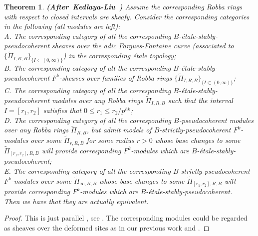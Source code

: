 \documentclass[12pt]{amsart}
\newtheorem{theorem}{Theorem}[section]
\theoremstyle{definition}
\numberwithin{equation}{section}
\begin{document}
\begin{theorem}\mbox{\bf{(After Kedlaya-Liu \cite[Theorem 4.6.1]{KL2})}}
Assume the corresponding Robba rings with respect to closed intervals are sheafy. Consider the corresponding categories in the following (all modules are left):\\
A. The corresponding category of all the corresponding $B$-\'etale-stably-pseudocoherent sheaves over the adic Fargues-Fontaine curve (associated to $\{\widetilde{\Pi}_{I,R,B}\}_{\{I\subset (0,\infty)\}}$) in the corresponding \'etale topology;\\
B. The corresponding category of all the corresponding $B$-\'etale-stably-pseudocoherent $F^k$-sheaves over families of Robba rings $\{\widetilde{\Pi}_{I,R,B}\}_{\{I\subset (0,\infty)\}}$;\\
C. The corresponding category of all the corresponding $B$-\'etale-stably-pseudocoherent modules over any Robba rings $\widetilde{\Pi}_{I,R,B}$ such that the interval $I=[r_1,r_2]$ satisfies that $0\leq r_1 \leq r_2/p^{hk}$;\\
D. The corresponding category of all the corresponding $B$-pseudocoherent modules over any Robba rings $\widetilde{\Pi}_{R,B}$, but admit models of $B$-strictly-pseudocoherent $F^k$-modules over some $\widetilde{\Pi}_{r,R,B}$ for some radius $r>0$ whose base changes to some $\widetilde{\Pi}_{[r_1,r_2],R,B}$ will provide corresponding $F^k$-modules which are $B$-\'etale-stably-pseudocoherent;\\
E. The corresponding category of all the corresponding $B$-strictly-pseudocoherent $F^k$-modules over some $\widetilde{\Pi}_{\infty,R,B}$ whose base changes to some $\widetilde{\Pi}_{[r_1,r_2],R,B}$ will provide corresponding $F^k$-modules which are $B$-\'etale-stably-pseudocoherent.\\
Then we have that they are actually equivalent.


\end{theorem}


\begin{proof}
This is just parallel \cite[Theorem 4.6.1]{KL2}, see \cite[Theorem 4.11]{XT2}. The corresponding modules could be regarded as sheaves over the deformed sites as in our previous work \cite{XT3} and \cite{XT4}.	
\end{proof}
\end{document}
